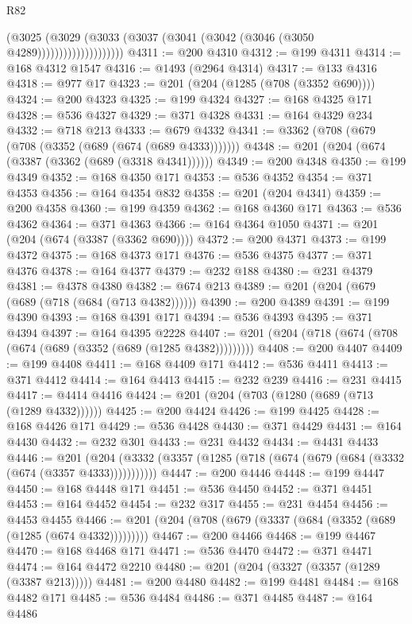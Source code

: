 \begin{lexlean}{R82}
\begin{coremodule}
                            (@3025
                              (@3029
                                (@3033 (@3037 (@3041 (@3042 (@3046 (@3050 @4289))))))))))))))))))))
@4311 := @200 @4310
@4312 := @199 @4311
@4314 := @168 @4312 @1547
@4316 := @1493 (@2964 @4314)
@4317 := @133 @4316
@4318 := @977 @17
@4323 := @201 (@204 (@1285 (@708 (@3352 @690))))
@4324 := @200 @4323
@4325 := @199 @4324
@4327 := @168 @4325 @171
@4328 := @536 @4327
@4329 := @371 @4328
@4331 := @164 @4329 @234
@4332 := @718 @213
@4333 := @679 @4332
@4341 := @3362 (@708 (@679 (@708 (@3352 (@689 (@674 (@689 @4333)))))))
@4348 := @201 (@204 (@674 (@3387 (@3362 (@689 (@3318 @4341))))))
@4349 := @200 @4348
@4350 := @199 @4349
@4352 := @168 @4350 @171
@4353 := @536 @4352
@4354 := @371 @4353
@4356 := @164 @4354 @832
@4358 := @201 (@204 @4341)
@4359 := @200 @4358
@4360 := @199 @4359
@4362 := @168 @4360 @171
@4363 := @536 @4362
@4364 := @371 @4363
@4366 := @164 @4364 @1050
@4371 := @201 (@204 (@674 (@3387 (@3362 @690))))
@4372 := @200 @4371
@4373 := @199 @4372
@4375 := @168 @4373 @171
@4376 := @536 @4375
@4377 := @371 @4376
@4378 := @164 @4377
@4379 := @232 @188
@4380 := @231 @4379
@4381 := @4378 @4380
@4382 := @674 @213
@4389 := @201 (@204 (@679 (@689 (@718 (@684 (@713 @4382))))))
@4390 := @200 @4389
@4391 := @199 @4390
@4393 := @168 @4391 @171
@4394 := @536 @4393
@4395 := @371 @4394
@4397 := @164 @4395 @2228
@4407 := @201 (@204 (@718 (@674 (@708 (@674 (@689 (@3352 (@689 (@1285 @4382)))))))))
@4408 := @200 @4407
@4409 := @199 @4408
@4411 := @168 @4409 @171
@4412 := @536 @4411
@4413 := @371 @4412
@4414 := @164 @4413
@4415 := @232 @239
@4416 := @231 @4415
@4417 := @4414 @4416
@4424 := @201 (@204 (@703 (@1280 (@689 (@713 (@1289 @4332))))))
@4425 := @200 @4424
@4426 := @199 @4425
@4428 := @168 @4426 @171
@4429 := @536 @4428
@4430 := @371 @4429
@4431 := @164 @4430
@4432 := @232 @301
@4433 := @231 @4432
@4434 := @4431 @4433
@4446 := @201
    (@204 (@3332 (@3357 (@1285 (@718 (@674 (@679 (@684 (@3332 (@674 (@3357 @4333)))))))))))
@4447 := @200 @4446
@4448 := @199 @4447
@4450 := @168 @4448 @171
@4451 := @536 @4450
@4452 := @371 @4451
@4453 := @164 @4452
@4454 := @232 @317
@4455 := @231 @4454
@4456 := @4453 @4455
@4466 := @201 (@204 (@708 (@679 (@3337 (@684 (@3352 (@689 (@1285 (@674 @4332)))))))))
@4467 := @200 @4466
@4468 := @199 @4467
@4470 := @168 @4468 @171
@4471 := @536 @4470
@4472 := @371 @4471
@4474 := @164 @4472 @2210
@4480 := @201 (@204 (@3327 (@3357 (@1289 (@3387 @213)))))
@4481 := @200 @4480
@4482 := @199 @4481
@4484 := @168 @4482 @171
@4485 := @536 @4484
@4486 := @371 @4485
@4487 := @164 @4486

\end{coremodule}
\end{lexlean}

